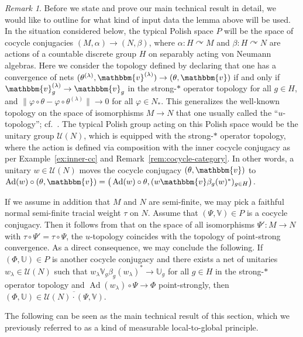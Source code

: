 \documentclass[11pt,a4paper]{article}
\theoremstyle{definition}
\theoremstyle{remark}
\newtheorem{remark}[theorem]{Remark}
\numberwithin{equation}{section}
\numberwithin{theorem}{section}
\begin{document}
\begin{remark} \label{rem:Polish-spaces}
Before we state and prove our main technical result in detail, we would like to outline for what kind of input data the lemma above will be used.
In the situation considered below, the typical Polish space $P$ will be the space of cocycle conjugacies $(M,\alpha)\to (N,\beta)$, where $\alpha: H\curvearrowright M$ and $\beta: H\curvearrowright N$ are actions of a countable discrete group $H$ on separably acting von Neumann algebras.
Here we consider the topology defined by declaring that one has a convergence of nets $(\theta^{(\lambda)},\mathbbm{v}^{(\lambda)})\to(\theta,\mathbbm{v})$ if and only if $\mathbbm{v}^{(\lambda)}_g\to\mathbbm{v}_g$ in the strong-$*$ operator topology for all $g\in H$, and $\|\varphi\circ\theta-\varphi\circ\theta^{(\lambda)}\|\to 0$ for all $\varphi\in N_*$.
This generalizes the well-known topology on the space of isomorphisms $M\to N$ that one usually called the ``$u$-topology''; cf.\ \cite{Haagerup75, Winslow98}.
The typical Polish group acting on this Polish space would be the unitary group $\mathcal{U}(N)$, which is equipped with the strong-$*$ operator topology, where the action is defined via composition with the inner cocycle conjugacy as per Example~\ref{ex:inner-cc} and Remark~\ref{rem:cocycle-category}.
In other words, a unitary $w\in\mathcal{U}(N)$ moves the cocycle conjugacy $(\theta,\mathbbm{v})$ to $\operatorname{Ad}(w)\circ(\theta,\mathbbm{v}) = \big( \operatorname{Ad}(w)\circ\theta, (w\mathbbm{v}\beta_g(w)^*)_{g\in H} \big)$.

If we assume in addition that $M$ and $N$ are semi-finite, we may pick a faithful normal semi-finite tracial weight $\tau$ on $N$.
Assume that $(\Psi,\mathbb{V})\in P$ is a cocycle conjugacy.
Then it follows from \cite[Proposition 3.7]{Haagerup75} that on the space of all isomorphisms $\Psi': M\to N$ with $\tau\circ\Psi'=\tau\circ\Psi$, the $u$-topology coincides with the topology of point-strong convergence.
As a direct consequence, we may conclude the following. 
If $(\Phi,\mathbb{U})\in P$ is another cocycle conjugacy and there exists a net of unitaries $w_\lambda\in\mathcal{U}(N)$ such that $w_\lambda\mathbb{V}_g\beta_g(w_\lambda)^*\to \mathbb{U}_g$ for all $g\in H$ in the strong-$*$ operator topology and $\operatorname{Ad}(w_\lambda)\circ\Psi\to\Phi$ point-strongly, then $(\Phi,\mathbb{U})\in\overline{ \mathcal{U}(N)\cdot (\Psi,\mathbb{V}) }$.
\end{remark}

The following can be seen as the main technical result of this section, which we previously referred to as a kind of measurable local-to-global principle.
\end{document}
